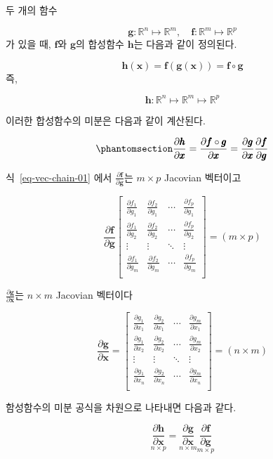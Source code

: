 \documentclass[
  11pt,
  a4paper,
  oneside]{scrbook}
\newcommand{\RR}{\mathbb{R}}
\newcommand{\pardifftwo}[2]{\frac{\partial #1}{\partial #2 }}
\theoremstyle{definition}
\theoremstyle{plain}
\theoremstyle{definition}
\theoremstyle{definition}
\theoremstyle{remark}
\begin{document}
두 개의 함수

\[
\pmb g :\RR^n \mapsto \RR^m, \quad \pmb f :\RR^m \mapsto \RR^p
\] 가 있을 때, \(\pmb f\)와 \(\pmb g\)의 합성함수 \(\pmb h\)는 다음과
같이 정의된다.

\[ \pmb h( \pmb x) = \pmb f( \pmb g( \pmb x)) = \pmb f \circ \pmb g\]
즉,

\[ 
\pmb h : \RR^n \mapsto \RR^m \mapsto \RR^p
\]

이러한 합성함수의 미분은 다음과 같이 계산된다.

\begin{equation}\phantomsection\label{eq-vec-chain-01}{
\pardifftwo{ \pmb h}{\pmb x} = \pardifftwo{ \pmb f \circ \pmb g}{\pmb x} = \pardifftwo{ \pmb g}{\pmb x} \pardifftwo{ \pmb f}{\pmb g}
}\end{equation}

식~\ref{eq-vec-chain-01} 에서 \(\pardifftwo{ \pmb f}{\pmb g}\)는
\(m \times p\) Jacovian 벡터이고

\[ 
\pardifftwo{ \pmb f}{\pmb g} 
\begin{bmatrix}
\pardifftwo{  f_1}{ g_1} &  \pardifftwo{  f_2}{ g_1} & \cdots &  \pardifftwo{  f_p}{ g_1} \\
\pardifftwo{  f_1}{ g_2} &  \pardifftwo{  f_2}{ g_2} & \cdots &  \pardifftwo{  f_p}{ g_2} \\
\vdots & \vdots & \ddots & \vdots \\
\pardifftwo{  f_1}{ g_m} &  \pardifftwo{  f_2}{ g_m} & \cdots &  \pardifftwo{  f_p}{ g_m} \\
\end{bmatrix}
=(m \times p)
\]

\(\pardifftwo{ \pmb g}{\pmb x}\)는 \(n \times m\) Jacovian 벡터이다

\[
\pardifftwo{ \pmb g}{\pmb x} =
\begin{bmatrix}
\pardifftwo{  g_1}{ x_1} &  \pardifftwo{  g_2}{ x_1} & \cdots &  \pardifftwo{  g_m}{ x_1} \\
\pardifftwo{  g_1}{ x_2} &  \pardifftwo{  g_2}{ x_2} & \cdots &  \pardifftwo{  g_m}{ x_2} \\
\vdots & \vdots & \ddots & \vdots \\
\pardifftwo{  g_1}{ x_n} &  \pardifftwo{  g_2}{ x_n} & \cdots &  \pardifftwo{  g_m}{ x_n} \\
\end{bmatrix}
= (n \times m)
\]

함성함수의 미분 공식을 차원으로 나타내면 다음과 같다.

\[
\underset{ n \times p} {\pardifftwo{ \pmb h}{\pmb x}} = \underset{ n \times m} {\pardifftwo{ \pmb g}{\pmb x}} \underset{ m \times p} {\pardifftwo{ \pmb f}{\pmb g}}
\]
\end{document}
